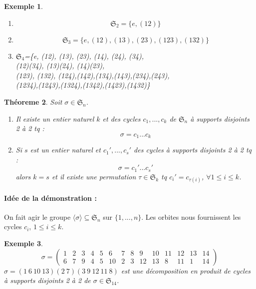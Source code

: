 \documentclass[a4paper, oneside]{report}
\theoremstyle{break}
\newtheorem{thm}{Théoreme}[section] %
\newtheorem{exem}[thm]{Exemple}
\renewcommand{\S}{\mathfrak{S}}
\begin{document}
\begin{exem}
	\begin{enumerate}
		\item $$\S_2=\{e, (12)\}$$
		\item $$\S_3=\{e, (12), (13), (23), (123), (132)\}$$
		\item
		\begin{center}
			$\S_4$=\{e, (12), (13), (23), (14), (24), (34),\\
			(12)(34), (13)(24), (14)(23),\\
			(123), (132), (124),(142),(134),(143),(234),(243),\\
			(1234),(1243),(1324),(1342),(1423),(1432)\}
		\end{center} 
	\end{enumerate}
\end{exem}

\begin{thm}
	Soit $\sigma\in \S_n$.
	\begin{enumerate}
		\item Il existe un entier naturel $k$ et des cycles $c_1,...,c_k$ de $\S_n$ à supports disjoints 2 à 2 tq :
		$$\sigma = c_1...c_k$$
		
		\item Si $s$ est un entier naturel et $c_1',...,c_s'$ des cycles à supports disjoints 2 à 2 tq :
		$$\sigma = c_1'...c_s'$$
		alors $k=s$ et il existe une permutation $\tau \in \S_k$ tq $c_i'=c_{\tau(i)}$, $\forall 1\leq i \leq k$.
	\end{enumerate}
\end{thm}

\paragraph{Idée de la démonstration :}
On fait agir le groupe $\langle\sigma\rangle \subseteq \S_n$ sur $\{1,...,n\}$. Les orbites nous fournissent les cycles $c_i$, $1\leq i \leq k$.

\begin{exem}
	$$\sigma = \left(\begin{array}{llllllllllllll}
	1&2&3&4&5&6&7&8&9&10&11&12&13&14\\
	6&7&9&4&5&10&2&3&12&13&8&11&1&14
	\end{array}\right)$$
	$\sigma = (1~6~10~13)(2~7)(3~9~12~11~8)$ est une décomposition en produit de cycles à supports disjoints 2 à 2 de $\sigma \in \S_{14}$.
\end{exem}
\end{document}
